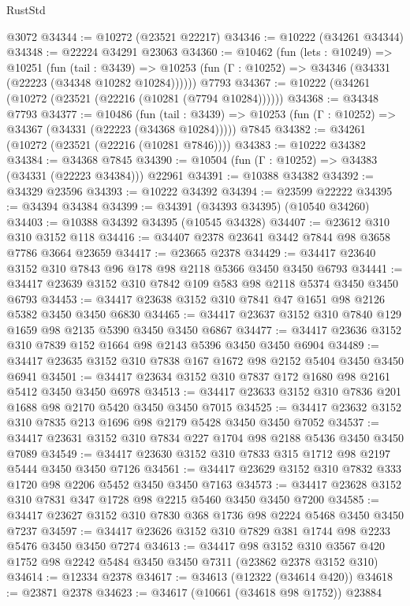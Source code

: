 \begin{lexlean}{RustStd}
\begin{coremodule}
    @3072
@34344 := @10272 (@23521 @22217)
@34346 := @10222 (@34261 @34344)
@34348 := @22224 @34291 @23063
@34360 := @10462
    (fun (lets : @10249) =>
    @10251
      (fun (tail : @3439) =>
      @10253 (fun (Γ : @10252) => @34346 (@34331 (@22223 (@34348 @10282 @10284))))))
    @7793
@34367 := @10222 (@34261 (@10272 (@23521 (@22216 (@10281 (@7794 @10284))))))
@34368 := @34348 @7793
@34377 := @10486
    (fun (tail : @3439) => @10253 (fun (Γ : @10252) => @34367 (@34331 (@22223 (@34368 @10284)))))
    @7845
@34382 := @34261 (@10272 (@23521 (@22216 (@10281 @7846))))
@34383 := @10222 @34382
@34384 := @34368 @7845
@34390 := @10504 (fun (Γ : @10252) => @34383 (@34331 (@22223 @34384))) @22961
@34391 := @10388 @34382
@34392 := @34329 @23596
@34393 := @10222 @34392
@34394 := @23599 @22222
@34395 := @34394 @34384
@34399 := @34391 (@34393 @34395) (@10540 @34260)
@34403 := @10388 @34392 @34395 (@10545 @34328)
@34407 := @23612 @310 @310 @3152 @118
@34416 := @34407 @2378 @23641 @3442 @7844 @98 @3658 @7786 @3664 @23659
@34417 := @23665 @2378
@34429 := @34417 @23640 @3152 @310 @7843 @96 @178 @98 @2118 @5366 @3450 @3450 @6793
@34441 := @34417 @23639 @3152 @310 @7842 @109 @583 @98 @2118 @5374 @3450 @3450 @6793
@34453 := @34417 @23638 @3152 @310 @7841 @47 @1651 @98 @2126 @5382 @3450 @3450 @6830
@34465 := @34417 @23637 @3152 @310 @7840 @129 @1659 @98 @2135 @5390 @3450 @3450 @6867
@34477 := @34417 @23636 @3152 @310 @7839 @152 @1664 @98 @2143 @5396 @3450 @3450 @6904
@34489 := @34417 @23635 @3152 @310 @7838 @167 @1672 @98 @2152 @5404 @3450 @3450 @6941
@34501 := @34417 @23634 @3152 @310 @7837 @172 @1680 @98 @2161 @5412 @3450 @3450 @6978
@34513 := @34417 @23633 @3152 @310 @7836 @201 @1688 @98 @2170 @5420 @3450 @3450 @7015
@34525 := @34417 @23632 @3152 @310 @7835 @213 @1696 @98 @2179 @5428 @3450 @3450 @7052
@34537 := @34417 @23631 @3152 @310 @7834 @227 @1704 @98 @2188 @5436 @3450 @3450 @7089
@34549 := @34417 @23630 @3152 @310 @7833 @315 @1712 @98 @2197 @5444 @3450 @3450 @7126
@34561 := @34417 @23629 @3152 @310 @7832 @333 @1720 @98 @2206 @5452 @3450 @3450 @7163
@34573 := @34417 @23628 @3152 @310 @7831 @347 @1728 @98 @2215 @5460 @3450 @3450 @7200
@34585 := @34417 @23627 @3152 @310 @7830 @368 @1736 @98 @2224 @5468 @3450 @3450 @7237
@34597 := @34417 @23626 @3152 @310 @7829 @381 @1744 @98 @2233 @5476 @3450 @3450 @7274
@34613 := @34417
    @98
    @3152
    @310
    @3567
    @420
    @1752
    @98
    @2242
    @5484
    @3450
    @3450
    @7311
    (@23862 @2378 @3152 @310)
@34614 := @12334 @2378
@34617 := @34613 (@12322 (@34614 @420))
@34618 := @23871 @2378
@34623 := @34617 (@10661 (@34618 @98 @1752)) @23884

\end{coremodule}
\end{lexlean}
